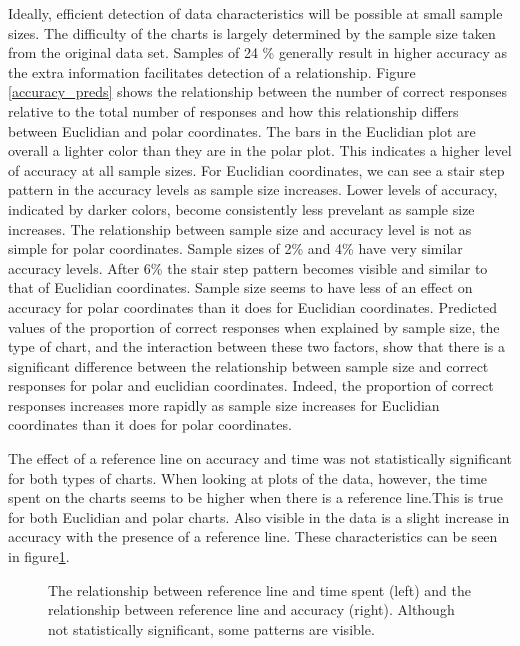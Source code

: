 Ideally, efficient detection of data characteristics will be possible at small sample sizes. The difficulty of the charts is largely determined by the sample size taken from the original data set. Samples of 24 \% generally result in higher accuracy as the extra information facilitates detection of a relationship. Figure \ref{accuracy_preds} shows the relationship between the number of correct responses relative to the total number of responses and how this relationship differs between Euclidian and polar coordinates. The bars in the Euclidian plot are overall a lighter color than they are in the polar plot. This indicates a higher level of accuracy at all sample sizes. For Euclidian coordinates, we can see a stair step pattern in the accuracy levels as sample size increases. Lower levels of accuracy, indicated by darker colors, become consistently less prevelant as sample size increases. The relationship between sample size and accuracy level is not as simple for polar coordinates. Sample sizes of 2\% and 4\% have very similar accuracy levels. After 6\% the stair step pattern becomes visible and similar to that of Euclidian coordinates. Sample size seems to have less of an effect on accuracy for polar coordinates than it does for Euclidian coordinates. Predicted values of the proportion of correct responses when explained by sample size, the type of chart, and the interaction between these two factors, show that there is a significant difference between the relationship between sample size and correct responses for polar and euclidian coordinates. Indeed, the proportion of correct responses increases more rapidly as sample size increases for Euclidian coordinates than it does for polar coordinates. 

The effect of a reference line on accuracy and time was not statistically significant for both types of charts. When looking at plots of the data, however, the time spent on the charts seems to be higher when there is a reference line.This is true for both Euclidian and polar charts. Also visible in the data is a slight increase in accuracy with the presence of a reference line. These characteristics can be seen in figure\ref{reflines}.  

\begin{figure}[htbp] %
   \centering
   \caption{The relationship between reference line and time spent (left) and the relationship between reference line and accuracy (right). Although not statistically significant, some patterns are visible.}
   \label{reflines}
\end{figure}







